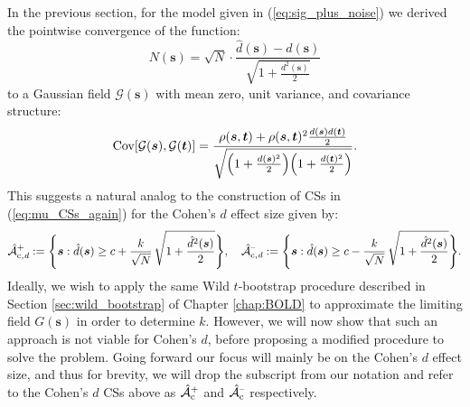 In the previous section, for the model given in (\ref{eq:sig_plus_noise}) we derived the pointwise convergence of the function:
\begin{equation}
\label{eq:Cohens_d_normalised error_field}
N(\bm{s}) = \sqrt{N} \cdot \frac{\hat{d}(\bm{s}) - d(\bm{s})}{\sqrt{1 + \frac{d^{2}({\bm{s}})}{2}}}
\end{equation}
to a Gaussian field $\mathcal{G}(\bm{s})$ with mean zero, unit variance, and covariance structure:
\begin{equation}
\label{eq:limiting_covariance_structure}
\operatorname{\mathrm{Cov}}[\mathcal{G}(\bm{s}),\mathcal{G}(\bm{t})] = \frac{\rho(\bm{s},\bm{t}) + \rho(\bm{s},\bm{t})^{2}\frac{d({\bm{s}})d({\bm{t}})}{2}}{\sqrt{\Big(1 + \frac{d({\bm{s}})^{2}}{2}\Big)\Big(1 + \frac{d({\bm{t}})^{2}}{2}\Big)}}.
\end{equation}
This suggests a natural analog to the construction of CSs in (\ref{eq:mu_CSs_again}) for the Cohen's $d$ effect size given by: 
\begin{equation}
\label{eq:cohens_CSs}
\operatorname{\hat{\mathcal{A}}_{c,\textit{d}}^+} := \Bigg\{\bm{s} : \hat{d}(\bm{s}) \geq c + \frac{k}{{\sqrt{N}}}\, \sqrt{1 + \frac{\hat{d}^{2}({\bm{s}})}{2}}\Bigg\}, \quad \operatorname{\hat{\mathcal{A}}_{c,\textit{d}}^{\textrm{--}}} := \Bigg\{\bm{s} : \hat{d}(\bm{s}) \geq c - \frac{k}{{\sqrt{N}}} \,\sqrt{1 + \frac{\hat{d}^{2}({\bm{s}})}{2}}  \Bigg\}.
\end{equation}
Ideally, we wish to apply the same Wild $t$-bootstrap procedure described in Section \ref{sec:wild_bootstrap} of Chapter \ref{chap:BOLD} to approximate the limiting field $G(\bm{s})$ in order to determine $k$. However, we will now show that such an approach is not viable for Cohen's $d$, before proposing a modified procedure to solve the problem. Going forward our focus will mainly be on the Cohen's $d$ effect size, and thus for brevity, we will drop the subscript from our notation and refer to the Cohen's $d$ CSs above as $\operatorname{\hat{\mathcal{A}}_{c}^+}$ and $\operatorname{\hat{\mathcal{A}}_{c}^{\textrm{--}}}$ respectively.


